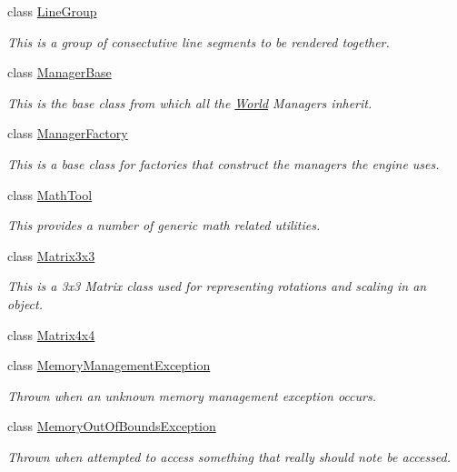 \begin{DoxyCompactItemize}
class \hyperlink{classMezzanine_1_1LineGroup}{Line\-Group}
\begin{DoxyCompactList}\small\item\em This is a group of consectutive line segments to be rendered together. \end{DoxyCompactList}\item 
class \hyperlink{classMezzanine_1_1ManagerBase}{Manager\-Base}
\begin{DoxyCompactList}\small\item\em This is the base class from which all the \hyperlink{classMezzanine_1_1World}{World} Managers inherit. \end{DoxyCompactList}\item 
class \hyperlink{classMezzanine_1_1ManagerFactory}{Manager\-Factory}
\begin{DoxyCompactList}\small\item\em This is a base class for factories that construct the managers the engine uses. \end{DoxyCompactList}\item 
class \hyperlink{classMezzanine_1_1MathTool}{Math\-Tool}
\begin{DoxyCompactList}\small\item\em This provides a number of generic math related utilities. \end{DoxyCompactList}\item 
class \hyperlink{classMezzanine_1_1Matrix3x3}{Matrix3x3}
\begin{DoxyCompactList}\small\item\em This is a 3x3 Matrix class used for representing rotations and scaling in an object. \end{DoxyCompactList}\item 
class \hyperlink{classMezzanine_1_1Matrix4x4}{Matrix4x4}
\item 
class \hyperlink{classMezzanine_1_1MemoryManagementException}{Memory\-Management\-Exception}
\begin{DoxyCompactList}\small\item\em Thrown when an unknown memory management exception occurs. \end{DoxyCompactList}\item 
class \hyperlink{classMezzanine_1_1MemoryOutOfBoundsException}{Memory\-Out\-Of\-Bounds\-Exception}
\begin{DoxyCompactList}\small\item\em Thrown when attempted to access something that really should note be accessed. \end{DoxyCompactList}\item 

\end{DoxyCompactItemize}
